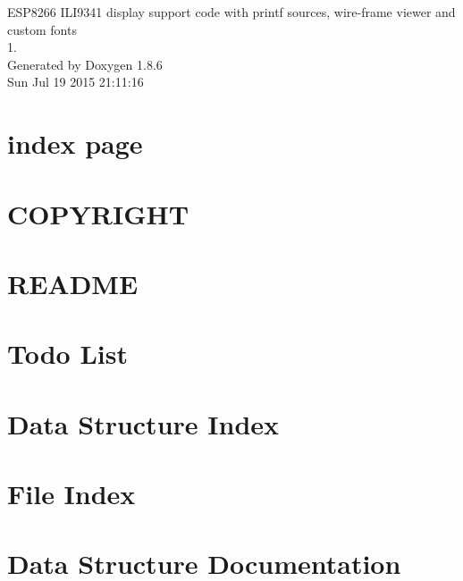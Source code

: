 \documentclass[twoside]{book}
\newcommand{\clearemptydoublepage}{%
  \newpage{\pagestyle{empty}\cleardoublepage}%
}
\begin{document}
\hypersetup{pageanchor=false}
\begin{titlepage}
\vspace*{7cm}
\begin{center}%
{\Large E\-S\-P8266 I\-L\-I9341 display support code with printf sources, wire-\/frame viewer and custom fonts \\[1ex]\large 1. }\\
\vspace*{1cm}
{\large Generated by Doxygen 1.8.6}\\
\vspace*{0.5cm}
{\small Sun Jul 19 2015 21:11:16}\\
\end{center}
\end{titlepage}
\clearemptydoublepage
\tableofcontents
\clearemptydoublepage
{}
\hypersetup{pageanchor=true}

\chapter{index page}
\label{index}\hypertarget{index}{}
\chapter{C\-O\-P\-Y\-R\-I\-G\-H\-T}
\label{md_COPYRIGHT}
\hypertarget{md_COPYRIGHT}{}

\chapter{R\-E\-A\-D\-M\-E}
\label{md_README}
\hypertarget{md_README}{}

\chapter{Todo List}
\label{todo}
\hypertarget{todo}{}

\chapter{Data Structure Index}

\chapter{File Index}

\chapter{Data Structure Documentation}
























\end{document}
